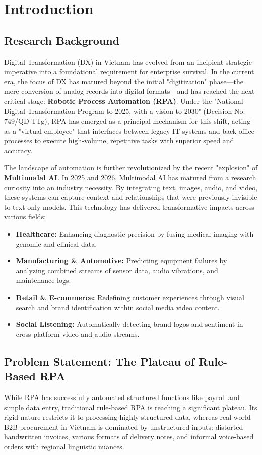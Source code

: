 \section{Introduction}

\subsection{Research Background}
Digital Transformation (DX) in Vietnam has evolved from an incipient strategic imperative into a foundational requirement for enterprise survival. In the current era, the focus of DX has matured beyond the initial "digitization" phase—the mere conversion of analog records into digital formats—and has reached the next critical stage: \textbf{Robotic Process Automation (RPA)}. Under the "National Digital Transformation Program to 2025, with a vision to 2030" (Decision No. 749/QD-TTg), RPA has emerged as a principal mechanism for this shift, acting as a "virtual employee" that interfaces between legacy IT systems and back-office processes to execute high-volume, repetitive tasks with superior speed and accuracy.

The landscape of automation is further revolutionized by the recent "explosion" of \textbf{Multimodal AI}. In 2025 and 2026, Multimodal AI has matured from a research curiosity into an industry necessity. By integrating text, images, audio, and video, these systems can capture context and relationships that were previously invisible to text-only models. This technology has delivered transformative impacts across various fields:
\begin{itemize}
    \item \textbf{Healthcare:} Enhancing diagnostic precision by fusing medical imaging with genomic and clinical data.
    \item \textbf{Manufacturing \& Automotive:} Predicting equipment failures by analyzing combined streams of sensor data, audio vibrations, and maintenance logs.
    \item \textbf{Retail \& E-commerce:} Redefining customer experiences through visual search and brand identification within social media video content.
    \item \textbf{Social Listening:} Automatically detecting brand logos and sentiment in cross-platform video and audio streams.
\end{itemize}

\subsection{Problem Statement: The Plateau of Rule-Based RPA}
While RPA has successfully automated structured functions like payroll and simple data entry, traditional rule-based RPA is reaching a significant plateau. Its rigid nature restricts it to processing highly structured data, whereas real-world B2B procurement in Vietnam is dominated by unstructured inputs: distorted handwritten invoices, various formats of delivery notes, and informal voice-based orders with regional linguistic nuances.

